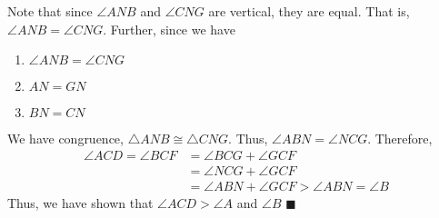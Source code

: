 \documentclass{report}
\begin{document}
\begin{itemize}
\begin{figure}[ht]
                \label{fig:tri5}
            \end{figure}
            \bigbreak \noindent 
            Note that since $\angle ANB$ and $\angle CNG$ are vertical, they are equal. That is, $\angle ANB = \angle CNG$. Further, since we have
            \begin{enumerate}
                \item $\angle ANB = \angle CNG $
                \item $AN = GN $
                \item $BN = CN$
            \end{enumerate}
            We have congruence, $\triangle ANB \cong \triangle CNG$. Thus, $\angle ABN = \angle NCG$. Therefore,
            \begin{align*}
                \angle ACD = \angle BCF &= \angle BCG + \angle GCF \\
                                        &= \angle NCG + \angle GCF \\
                                        &= \angle ABN + \angle GCF > \angle ABN = \angle B
            \end{align*}
            \bigbreak \noindent 
            Thus, we have shown that $\angle ACD > \angle A$ and $\angle B$ \hspace*{\fill} $\blacksquare$
            
    \end{itemize}

    \pagebreak 
\end{document}
